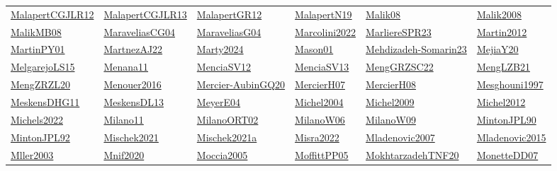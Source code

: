 \begin{longtable}{*{6}{l}}
\hyperref[detail:MalapertCGJLR12]{MalapertCGJLR12} & \hyperref[detail:MalapertCGJLR13]{MalapertCGJLR13} & \hyperref[detail:MalapertGR12]{MalapertGR12} & \hyperref[detail:MalapertN19]{MalapertN19} & \hyperref[detail:Malik08]{Malik08} & \hyperref[detail:Malik2008]{Malik2008}\\ 
\hyperref[detail:MalikMB08]{MalikMB08} & \hyperref[detail:MaraveliasCG04]{MaraveliasCG04} & \hyperref[detail:MaraveliasG04]{MaraveliasG04} & \hyperref[detail:Marcolini2022]{Marcolini2022} & \hyperref[detail:MarliereSPR23]{MarliereSPR23} & \hyperref[detail:Martin2012]{Martin2012}\\ 
\hyperref[detail:MartinPY01]{MartinPY01} & \hyperref[detail:MartnezAJ22]{MartnezAJ22} & \hyperref[detail:Marty2024]{Marty2024} & \hyperref[detail:Mason01]{Mason01} & \hyperref[detail:Mehdizadeh-Somarin23]{Mehdizadeh-Somarin23} & \hyperref[detail:MejiaY20]{MejiaY20}\\ 
\hyperref[detail:MelgarejoLS15]{MelgarejoLS15} & \hyperref[detail:Menana11]{Menana11} & \hyperref[detail:MenciaSV12]{MenciaSV12} & \hyperref[detail:MenciaSV13]{MenciaSV13} & \hyperref[detail:MengGRZSC22]{MengGRZSC22} & \hyperref[detail:MengLZB21]{MengLZB21}\\ 
\hyperref[detail:MengZRZL20]{MengZRZL20} & \hyperref[detail:Menouer2016]{Menouer2016} & \hyperref[detail:Mercier-AubinGQ20]{Mercier-AubinGQ20} & \hyperref[detail:MercierH07]{MercierH07} & \hyperref[detail:MercierH08]{MercierH08} & \hyperref[detail:Mesghouni1997]{Mesghouni1997}\\ 
\hyperref[detail:MeskensDHG11]{MeskensDHG11} & \hyperref[detail:MeskensDL13]{MeskensDL13} & \hyperref[detail:MeyerE04]{MeyerE04} & \hyperref[detail:Michel2004]{Michel2004} & \hyperref[detail:Michel2009]{Michel2009} & \hyperref[detail:Michel2012]{Michel2012}\\ 
\hyperref[detail:Michels2022]{Michels2022} & \hyperref[detail:Milano11]{Milano11} & \hyperref[detail:MilanoORT02]{MilanoORT02} & \hyperref[detail:MilanoW06]{MilanoW06} & \hyperref[detail:MilanoW09]{MilanoW09} & \hyperref[detail:MintonJPL90]{MintonJPL90}\\ 
\hyperref[detail:MintonJPL92]{MintonJPL92} & \hyperref[detail:Mischek2021]{Mischek2021} & \hyperref[detail:Mischek2021a]{Mischek2021a} & \hyperref[detail:Misra2022]{Misra2022} & \hyperref[detail:Mladenovic2007]{Mladenovic2007} & \hyperref[detail:Mladenovic2015]{Mladenovic2015}\\ 
\hyperref[detail:Mller2003]{Mller2003} & \hyperref[detail:Mnif2020]{Mnif2020} & \hyperref[detail:Moccia2005]{Moccia2005} & \hyperref[detail:MoffittPP05]{MoffittPP05} & \hyperref[detail:MokhtarzadehTNF20]{MokhtarzadehTNF20} & \hyperref[detail:MonetteDD07]{MonetteDD07}\\ 

\end{longtable}
